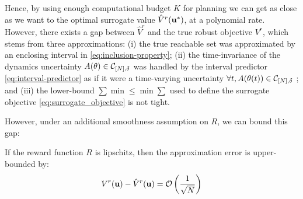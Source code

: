 \documentclass{article}
\begin{document}
Hence, by using enough computational budget $K$ for planning we can get as close as we want to the optimal surrogate value $\hat{V}^r(\mathbf{u}^*)$, at a polynomial rate. However, there exists a gap between $\hat{V}^r$ and the true robust objective $V^r$, which stems from three approximations: (i) the true reachable set was approximated by an enclosing interval in \eqref{eq:inclusion-property}; (ii) the time-invariance of the dynamics uncertainty $A(\theta)\in\mathcal{C}_{[N],\delta}$ was handled by the interval predictor \eqref{eq:interval-predictor} as if it were a time-varying uncertainty $\forall t, A(\theta(t))\in\mathcal{C}_{[N],\delta}$ ; and (iii) the lower-bound $\sum\min\leq \min\sum$ used to define the surrogate objective \eqref{eq:surrogate_objective} is not tight.

However, under an additional smoothness assumption on $R$, we can bound this gap:
\begin{proposition}
\label{prop:control-error}
If the reward function $R$ is lipschitz, then the approximation error is upper-bounded by:
\begin{equation*}
     V^r(\mathbf{u}) - \hat{V}^r(\mathbf{u}) = \mathcal{O}\left(\frac{1}{\sqrt{N}}\right)
\end{equation*}
\end{proposition}

\end{document}
